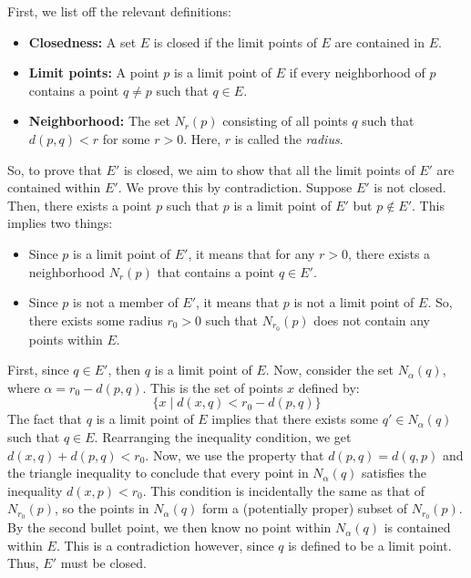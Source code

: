 \documentclass[10pt]{article}
\begin{document}
	\begin{solution}
		First, we list off the relevant definitions:
		\begin{itemize}
			\item \textbf{Closedness:} A set \( E \) is closed if the limit points of \( E \) are contained in \( E \). 
			\item \textbf{Limit points:} A point \( p \) is a limit point of \( E \) if every neighborhood 
				of \( p \) contains a point \( q \neq p \) such that \( q \in E \). 
			\item \textbf{Neighborhood:} The set \( N_r(p) \) consisting of all points \( q \) such that 
				\( d(p, q) < r \) for some \( r > 0 \). Here, \( r \) is called the \textit{radius}. 
		\end{itemize}
		So, to prove that \( E' \) is closed, we aim to show that all the limit points of \( E' \) are contained
		within \( E' \). We prove this by contradiction. 
		Suppose \( E' \) is not closed. Then, there exists a point \( p \) such that \( p \) is a limit point of 
		\( E' \) but \( p \not \in E' \). This implies two things: 
		\begin{itemize}
			\item Since \( p \) is a limit point of \( E' \), it means that for any \( r > 0 \), there exists 
				a neighborhood \( N_r(p) \) that contains a point \( q \in E' \).  
			\item Since \( p \) is not a member of \( E' \), it means that \( p \) is not a limit point of \( E \). So, 
				there exists some radius \( r_0 > 0 \) such that \( N_{r_0}(p) \) does not contain 
				any points within \( E \).  
		\end{itemize}
		First, since \( q \in E' \), then \( q \) is a limit point of \( E \). Now, consider 
		the set \( N_\alpha(q) \), where \( \alpha = r_0 - d(p, q) \). This is the set of points 
		\( x \) defined by:
		\[
		\{x \mid d(x, q) < r_0 - d(p, q)\} 
		\] 
		The fact that \( q \) is a limit point of \( E \) implies that there exists some \( q' \in N_{\alpha}(q)\) 
		such that \( q \in E \). 
		Rearranging the inequality condition, 
		we get \( d(x, q) + d(p, q) < r_0 \). Now, we use the property that \( d(p, q)
		= d(q, p)\) and the triangle inequality to conclude that every point in \( N_{\alpha}(q) \) satisfies the 
		inequality \( d(x, p) < r_0 \). This condition is incidentally the same as that of \( N_{r_0}(p) \), 
		so the points in \( N_{\alpha}(q) \) form a (potentially proper) subset of \( N_{r_0}(p) \). By the 
		second bullet point, we then know no point within \( N_{\alpha}(q) \) is contained within \( E \). This is a 
		contradiction however, since \( q \) is defined to be a limit point. Thus, \( E' \) must 
		be closed. 


\end{solution}
\end{document}
